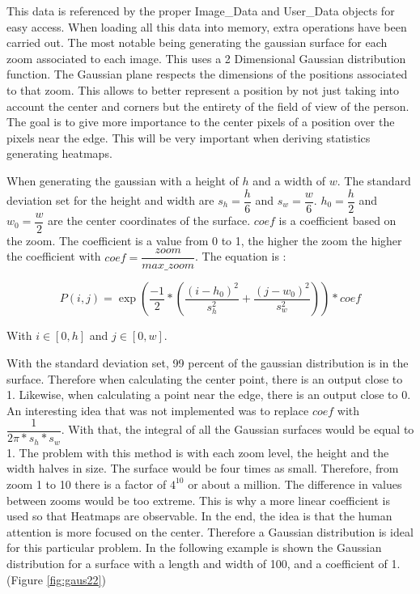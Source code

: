 \documentclass[a4paper,11pt]{report}
\numberwithin{figure}{section} %
\begin{document}
    This data is referenced by the proper Image\_Data and User\_Data objects for easy access.
    When loading all this data into memory, extra operations have been carried out.
    The most notable being generating the gaussian surface for each zoom associated to each image.
    This uses a 2 Dimensional Gaussian distribution function.
    The Gaussian plane respects the dimensions of the positions associated to that zoom.
    This allows to better represent a position by not just taking into account the center and corners but the entirety of the field of view of the person.
    The goal is to give more importance to the center pixels of a position over the pixels near the edge.
    This will be very important when deriving statistics generating heatmaps.

    When generating the gaussian with a height of $h$ and a width of $w$.
    The standard deviation set for the height and width are $s_h = \dfrac{h}{6}$ and $s_w = \dfrac{w}{6}$.
    $h_0 = \dfrac{h}{2}$ and $w_0 = \dfrac{w}{2}$ are the center coordinates of the surface.
    $coef$ is a coefficient based on the zoom.
    The coefficient is a value from 0 to 1, the higher the zoom the higher the coefficient with $coef = \dfrac{zoom}{max\_zoom}$.
    The equation is :

        \[P(i,j) = \exp(\dfrac{-1}{2}*(\dfrac{(i - h_0)^2}{s_h^2} + \dfrac{(j - w_0)^2}{s_w^2})) * coef \]

    With $i \in [0, h]$ and $j \in [0, w]$.

    With the standard deviation set, 99 percent of the gaussian distribution is in the surface.
    Therefore when calculating the center point, there is an output close to 1.
    Likewise, when calculating a point near the edge, there is an output close to 0.
    An interesting idea that was not implemented was to replace $coef$ with $\dfrac{1}{2\pi*s_h*s_w}$.
    With that, the integral of all the Gaussian surfaces would be equal to 1.
    The problem with this method is with each zoom level, the height and the width halves in size.
    The surface would be four times as small.
    Therefore, from zoom 1 to 10 there is a factor of $4^{10}$ or about a million.
    The difference in values between zooms would be too extreme.
    This is why a more linear coefficient is used so that Heatmaps are observable.
    In the end, the idea is that the human attention is more focused on the center.
    Therefore a Gaussian distribution is ideal for this particular problem.
    In the following example is shown the Gaussian distribution for a surface with a length and width of 100, and a coefficient of 1. (Figure \ref{fig:gaus22})
\end{document}
